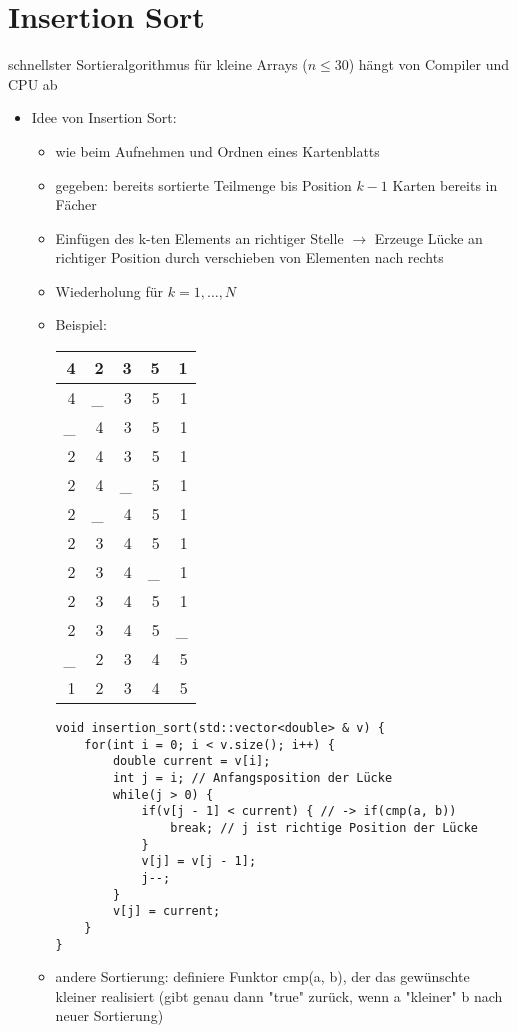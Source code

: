 \documentclass[a4paper]{scrartcl}
\theoremstyle{definition}
\theoremstyle{plain}
\theoremstyle{remark}
\theoremstyle{remark}
\begin{document}
\section{Insertion Sort}
\label{sec-13}
schnellster Sortieralgorithmus für kleine Arrays ($n\leq 30$) hängt von Compiler und CPU ab
\begin{itemize}
\item Idee von Insertion Sort:
\begin{itemize}
\item wie beim Aufnehmen und Ordnen eines Kartenblatts
\item gegeben: bereits sortierte Teilmenge bis Position $k - 1$ Karten bereits in Fächer
\item Einfügen des k-ten Elements an richtiger Stelle $\rightarrow$ Erzeuge Lücke an richtiger Position durch verschieben von Elementen nach rechts
\item Wiederholung für $k = 1, \ldots, N$
\item Beispiel:
\begin{center}
\begin{tabular}{rrrrr}
4 & 2 & 3 & 5 & 1\\
\hline
4 & \_ & 3 & 5 & 1\\
\_ & 4 & 3 & 5 & 1\\
2 & 4 & 3 & 5 & 1\\
\hline
2 & 4 & \_ & 5 & 1\\
2 & \_ & 4 & 5 & 1\\
2 & 3 & 4 & 5 & 1\\
\hline
2 & 3 & 4 & \_ & 1\\
2 & 3 & 4 & 5 & 1\\
\hline
2 & 3 & 4 & 5 & \_\\
\_ & 2 & 3 & 4 & 5\\
1 & 2 & 3 & 4 & 5\\
\end{tabular}
\end{center}
\begin{verbatim}
void insertion_sort(std::vector<double> & v) {
	for(int i = 0; i < v.size(); i++) {
		double current = v[i];
		int j = i; // Anfangsposition der Lücke
		while(j > 0) {
			if(v[j - 1] < current) { // -> if(cmp(a, b))
				break; // j ist richtige Position der Lücke
			}
			v[j] = v[j - 1];
			j--;
		}
		v[j] = current;
	}
}
\end{verbatim}
\item andere Sortierung: definiere Funktor cmp(a, b), der das gewünschte kleiner realisiert (gibt genau dann "true" zurück, wenn a "kleiner" b nach neuer Sortierung)

\end{itemize}
\end{itemize}
\end{document}
